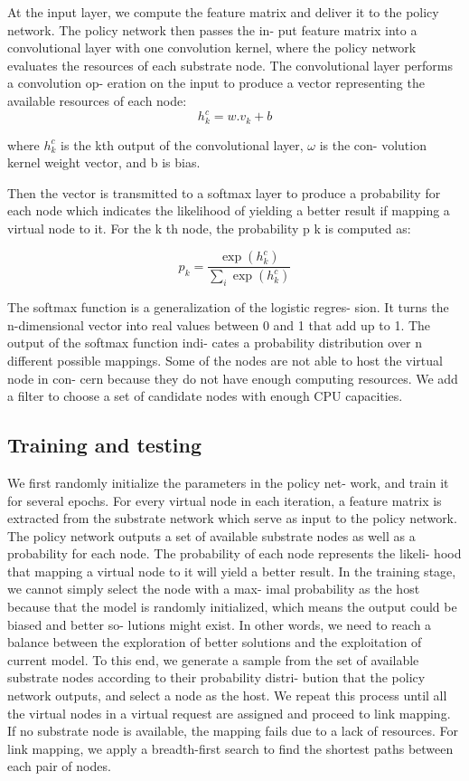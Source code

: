 \documentclass[12pt]{article}
\begin{document}
At the input layer, we compute the feature matrix and deliver
it to the policy network. The policy network then passes the in-
put feature matrix into a convolutional layer with one convolution
kernel, where the policy network evaluates the resources of each
substrate node. The convolutional layer performs a convolution op-
eration on the input to produce a vector representing the available
resources of each node:
\begin{equation}
h_k^c = w . v_k + b
\end{equation}

where $h_k^c$ is the kth output of the convolutional layer, $ω$ is the con-
volution kernel weight vector, and b is bias.

Then the vector is transmitted to a softmax layer to produce a
probability for each node which indicates the likelihood of yielding
a better result if mapping a virtual node to it. For the k th node, the
probability p k is computed as:

\begin{equation}
p_k = \frac{\exp(h_k^c)}{\sum_{i}\exp(h_k^c)}
\end{equation}

The softmax function is a generalization of the logistic regres-
sion. It turns the n-dimensional vector into real values between 0
and 1 that add up to 1. The output of the softmax function indi-
cates a probability distribution over n different possible mappings.
Some of the nodes are not able to host the virtual node in con-
cern because they do not have enough computing resources. We
add a filter to choose a set of candidate nodes with enough CPU
capacities.

\subsection{Training and testing}
We first randomly initialize the parameters in the policy net-
work, and train it for several epochs. For every virtual node in each
iteration, a feature matrix is extracted from the substrate network
which serve as input to the policy network. The policy network
outputs a set of available substrate nodes as well as a probability
for each node. The probability of each node represents the likeli-
hood that mapping a virtual node to it will yield a better result. In
the training stage, we cannot simply select the node with a max-
imal probability as the host because that the model is randomly initialized, which means the output could be biased and better so-
lutions might exist. In other words, we need to reach a balance
between the exploration of better solutions and the exploitation
of current model. To this end, we generate a sample from the set
of available substrate nodes according to their probability distri-
bution that the policy network outputs, and select a node as the
host. We repeat this process until all the virtual nodes in a virtual
request are assigned and proceed to link mapping. If no substrate
node is available, the mapping fails due to a lack of resources. For
link mapping, we apply a breadth-first search to find the shortest
paths between each pair of nodes.
\end{document}
